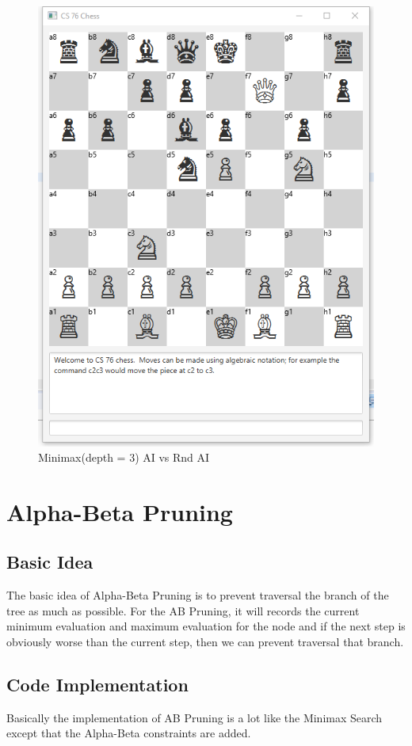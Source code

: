 \documentclass{article}
\begin{document}
\begin{figure}[H]
\centering
\includegraphics[width=0.7\linewidth]{max_3_rnd}
\caption{Minimax(depth = 3) AI vs Rnd AI}
\end{figure}

\section{Alpha-Beta Pruning}
\subsection{Basic Idea}
The basic idea of Alpha-Beta Pruning is to prevent traversal the branch of the tree as much as possible. For the AB Pruning, it will records the current minimum evaluation and maximum evaluation for the node and if the next step is obviously worse than the current step, then we can prevent traversal that branch.

\subsection{Code Implementation}
Basically the implementation of AB Pruning is a lot like the Minimax Search except that the Alpha-Beta constraints are added.
\end{document}
